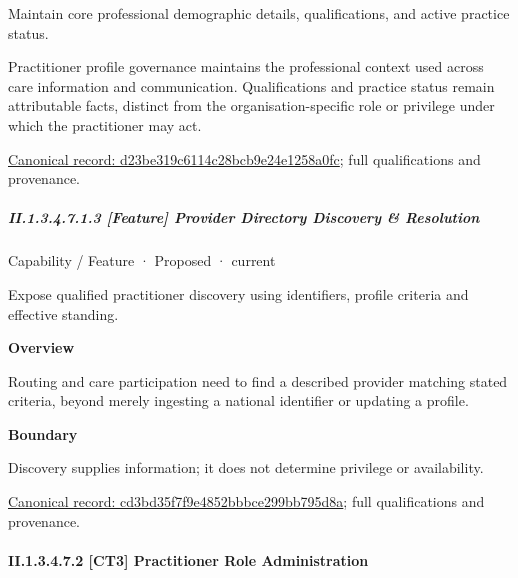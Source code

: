 Maintain core professional demographic details, qualifications, and active practice status.



Practitioner profile governance maintains the professional context used across care information and communication. Qualifications and practice status remain attributable facts, distinct from the organisation-specific role or privilege under which the practitioner may act.


{\footnotesize \href{../../../../continuum/strategy/capability/feature/d23be319c6114c28bcb9e24e1258a0fc.md}{Canonical record: d23be319c6114c28bcb9e24e1258a0fc}; full qualifications and provenance.}\par
\subparagraph*{II.1.3.4.7.1.3 [Feature] Provider Directory Discovery \& Resolution}
\label{navigation:II.1.3.4.7.1.3}

\label{element:cd3bd35f7f9e4852bbbce299bb795d8a}
{\small Capability / Feature · Proposed · current}\par

Expose qualified practitioner discovery using identifiers, profile criteria and effective standing.



\textbf{Overview}



Routing and care participation need to find a described provider matching stated criteria, beyond merely ingesting a national identifier or updating a profile.



\textbf{Boundary}



Discovery supplies information; it does not determine privilege or availability.


{\footnotesize \href{../../../../continuum/strategy/capability/feature/cd3bd35f7f9e4852bbbce299bb795d8a.md}{Canonical record: cd3bd35f7f9e4852bbbce299bb795d8a}; full qualifications and provenance.}\par
\paragraph*{II.1.3.4.7.2 [CT3] Practitioner Role Administration}
\label{navigation:II.1.3.4.7.2}

